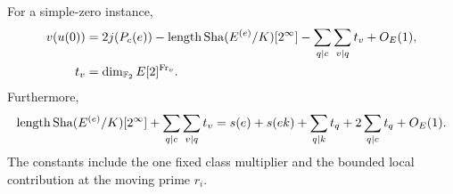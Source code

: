 \begin{lemma}
\label{lem:h:central-valuation}
For a simple-zero instance,
\begin{equation}\label{eq:h:central-determinant}
 \begin{aligned}
 v(u(0))&=2j(P_c(e))
   -\operatorname{length}\operatorname{Sha}(E^{(e)}/K)[2^\infty]
   -\sum_{q\mid c}\sum_{v\mid q}t_v+O_E(1),\\
 t_v&=\dim_{\mathbb F_2}E[2]^{\operatorname{Fr}_v}.
 \end{aligned}
\end{equation}
Furthermore,
\begin{equation}\label{eq:h:weil-restriction-length}
 \operatorname{length}\operatorname{Sha}(E^{(e)}/K)[2^\infty]
       +\sum_{q\mid c}\sum_{v\mid q}t_v
 =s(e)+s(ek)+\sum_{q\mid k}t_q
                         +2\sum_{q\mid c}t_q+O_E(1).
\end{equation}
The constants include the one fixed class multiplier and the bounded
local contribution at the moving prime $r_i$.
\end{lemma}

